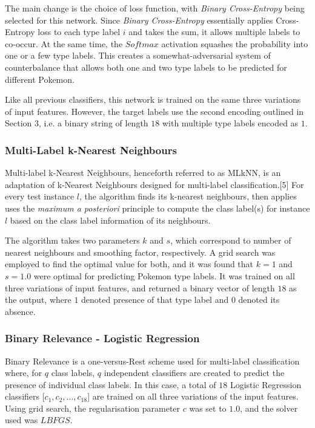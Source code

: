 \documentclass{winnower}
\begin{document}
The main change is the choice of loss function, with \emph{Binary Cross-Entropy} being selected for this network. Since \emph{Binary Cross-Entropy} essentially applies Cross-Entropy loss to each type label $i$ and takes the sum, it allows multiple labels to co-occur. At the same time, the $Softmax$ activation squashes the probability into one or a few type labels. This creates a somewhat-adversarial system of counterbalance that allows both one and two type labels to be predicted for different Pokemon. 

Like all previous classifiers, this network is trained on the same three variations of input features. However, the target labels use the second encoding outlined in Section $3$, i.e. a binary string of length $18$ with multiple type labels encoded as $1$. 

\subsubsection{Multi-Label k-Nearest Neighbours}
Multi-label k-Nearest Neighbours, henceforth referred to as MLkNN, is an adaptation of k-Nearest Neighbours designed for multi-label classification.[5] For every test instance $l$, the algorithm finds its k-nearest neighbours, then applies uses the \textit{maximum a posteriori} principle to compute the class label(s) for instance $l$ based on the class label information of its neighbours.

The algorithm takes two parameters $k$ and $s$, which correspond to number of nearest neighbours and smoothing factor, respectively. A grid search was employed to find the optimal value for both, and it was found that $k = 1$ and $s = 1.0$ were optimal for predicting Pokemon type labels. It was trained on all three variations of input features, and returned a binary vector of length $18$ as the output, where $1$ denoted presence of that type label and $0$ denoted its absence.

\subsubsection{Binary Relevance - Logistic Regression}
Binary Relevance is a one-versus-Rest scheme used for multi-label classification where, for $q$ class labels, $q$ independent classifiers are created to predict the presence of individual class labels. In this case, a total of $18$ Logistic Regression classifiers [$c_{1}, c_{2}, ..., c_{18}$] are trained on all three variations of the input features. Using grid search, the regularisation parameter $c$ was set to $1.0$, and the solver used was $LBFGS$.
\end{document}
